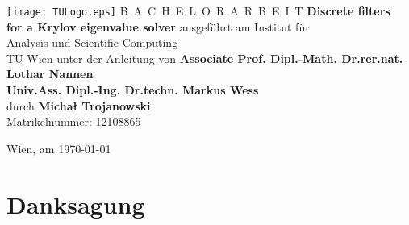 \documentclass[a4paper,11pt,bibliography=totoc,listof=totoc,headinclude=true,cleardoublepage=empty,oneside]{scrbook}
\begin{document}


\begin{titlepage}
  \begin{center}
    \texttt{[image: TULogo.eps]}
    \vskip 1cm%
    {\LARGE B~\Large A~C~H~E~L~O~R~A~R~B~E~I~T}
    \vskip 8mm
    {\huge\bfseries Discrete filters  \\[1ex] for a Krylov eigenvalue solver}
    \vskip 1cm
    \large 
    ausgef\"uhrt am    
    \vskip 0.75cm
    {\Large Institut f\"ur\\[1ex] Analysis und Scientific Computing}\\[1ex]
    {\Large TU Wien}
    \vskip0.75cm
    unter der Anleitung von
    \vskip0.75cm
    {\Large\bfseries 
Associate Prof. Dipl.-Math. Dr.rer.nat. Lothar Nannen \\ 
Univ.Ass. Dipl.-Ing. Dr.techn. Markus Wess}\\[1ex]
    \vskip 0.5cm
    durch
    \vskip 0.5cm
    {\Large\bfseries Michał Trojanowski}\\[1ex]
    Matrikelnummer: 12108865\\[1ex]
  \end{center}
  
  \vfill
  
  \small
  Wien, am \today
  \vspace*{-15mm}
\end{titlepage}

\cleardoublepage


\chapter*{Danksagung} %
\thispagestyle{empty}
\end{document}
